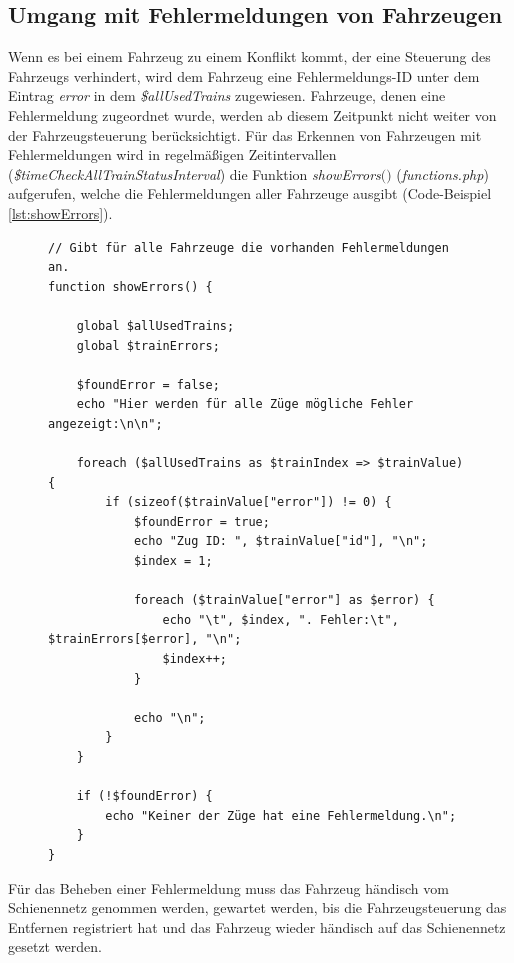 \subsection{Umgang mit Fehlermeldungen von Fahrzeugen} \label{main_7}
Wenn es bei einem Fahrzeug zu einem Konflikt kommt, der eine Steuerung des Fahrzeugs verhindert, wird dem Fahrzeug eine Fehlermeldungs-ID unter dem Eintrag \textit{error} in dem \textit{\$allUsedTrains} zugewiesen. Fahrzeuge, denen eine Fehlermeldung zugeordnet wurde, werden ab diesem Zeitpunkt nicht weiter von der Fahrzeugsteuerung berücksichtigt. Für das Erkennen von Fahrzeugen mit Fehlermeldungen wird in regelmäßigen Zeitintervallen (\textit{\$time\-Check\-All\-Train\-Sta\-tus\-Inter\-val}) die Funktion \textit{showErrors$($$)$} (\textit{functions.php}) aufgerufen, welche die Fehlermeldungen aller Fahrzeuge ausgibt (Code-Beispiel \ref{lst:showErrors}).
\begin{figure}
\begin{lstlisting}[caption={\textit{showErrors$($$)$} (\textit{functions.php})},captionpos=b,label={lst:showErrors}]
// Gibt für alle Fahrzeuge die vorhanden Fehlermeldungen an.
function showErrors() {

	global $allUsedTrains;
	global $trainErrors;

	$foundError = false;
	echo "Hier werden für alle Züge mögliche Fehler angezeigt:\n\n";

	foreach ($allUsedTrains as $trainIndex => $trainValue) {
		if (sizeof($trainValue["error"]) != 0) {
			$foundError = true;
			echo "Zug ID: ", $trainValue["id"], "\n";
			$index = 1;

			foreach ($trainValue["error"] as $error) {
				echo "\t", $index, ". Fehler:\t", $trainErrors[$error], "\n";
				$index++;
			}

			echo "\n";
		}
	}

	if (!$foundError) {
		echo "Keiner der Züge hat eine Fehlermeldung.\n";
	}
}
\end{lstlisting}
\end{figure}
Für das Beheben einer Fehlermeldung muss das Fahrzeug händisch vom Schienennetz genommen werden, gewartet werden, bis die Fahrzeugsteuerung das Entfernen registriert hat und das Fahrzeug wieder händisch auf das Schienennetz gesetzt werden.

